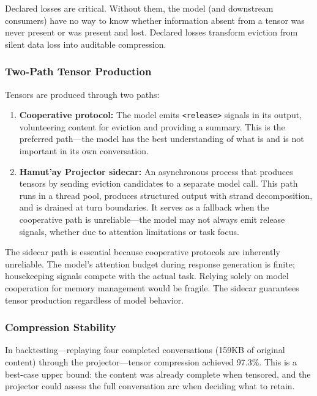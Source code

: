 \documentclass[sigplan,screen,anonymous]{acmart}
\begin{document}
Declared losses are critical. Without them, the model (and downstream
consumers) have no way to know whether information absent from a
tensor was never present or was present and lost. Declared losses
transform eviction from silent data loss into auditable compression.

\subsubsection{Two-Path Tensor Production}

Tensors are produced through two paths:

\begin{enumerate}
\item \textbf{Cooperative protocol:} The model emits
  \texttt{<release>} signals in its output, volunteering content for
  eviction and providing a summary. This is the preferred path---the
  model has the best understanding of what is and is not important in
  its own conversation.

\item \textbf{Hamut'ay Projector sidecar:} An asynchronous process
  that produces tensors by sending eviction candidates to a separate
  model call. This path runs in a thread pool, produces structured
  output with strand decomposition, and is drained at turn boundaries.
  It serves as a fallback when the cooperative path is unreliable---the
  model may not always emit release signals, whether due to attention
  limitations or task focus.
\end{enumerate}

The sidecar path is essential because cooperative protocols are
inherently unreliable. The model's attention budget during response
generation is finite; housekeeping signals compete with the actual
task. Relying solely on model cooperation for memory management would
be fragile. The sidecar guarantees tensor production regardless of
model behavior.

\subsubsection{Compression Stability}

In backtesting---replaying four completed conversations (159KB of
original content) through the projector---tensor compression achieved
97.3\%. This is a best-case upper bound: the content was already
complete when tensored, and the projector could assess the full
conversation arc when deciding what to retain.
\end{document}
